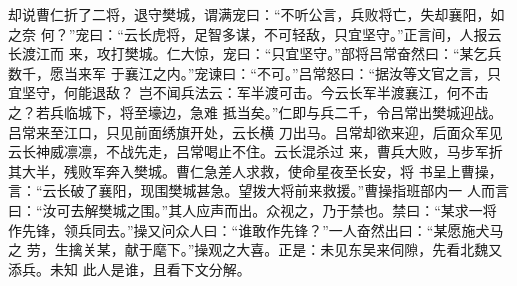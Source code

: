 却说曹仁折了二将，退守樊城，谓满宠曰：“不听公言，兵败将亡，失却襄阳，如之奈
何？”宠曰：“云长虎将，足智多谋，不可轻敌，只宜坚守。”正言间，人报云长渡江而
来，攻打樊城。仁大惊，宠曰：“只宜坚守。”部将吕常奋然曰：“某乞兵数千，愿当来军
于襄江之内。”宠谏曰：“不可。”吕常怒曰：“据汝等文官之言，只宜坚守，何能退敌？
岂不闻兵法云：军半渡可击。今云长军半渡襄江，何不击之？若兵临城下，将至壕边，急难
抵当矣。”仁即与兵二千，令吕常出樊城迎战。吕常来至江口，只见前面绣旗开处，云长横
刀出马。吕常却欲来迎，后面众军见云长神威凛凛，不战先走，吕常喝止不住。云长混杀过
来，曹兵大败，马步军折其大半，残败军奔入樊城。曹仁急差人求救，使命星夜至长安，将
书呈上曹操，言：“云长破了襄阳，现围樊城甚急。望拨大将前来救援。”曹操指班部内一
人而言曰：“汝可去解樊城之围。”其人应声而出。众视之，乃于禁也。禁曰：“某求一将
作先锋，领兵同去。”操又问众人曰：“谁敢作先锋？”一人奋然出曰：“某愿施犬马之
劳，生擒关某，献于麾下。”操观之大喜。正是：未见东吴来伺隙，先看北魏又添兵。未知
此人是谁，且看下文分解。